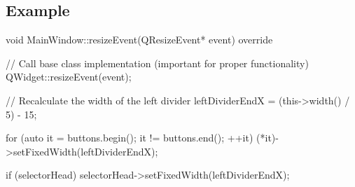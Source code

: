 \documentclass{report}
\begin{document}
    \subsection{Example}
    \bigbreak \noindent 
    \begin{cppcode}
void MainWindow::resizeEvent(QResizeEvent* event) override {
    // Call base class implementation (important for proper functionality)
    QWidget::resizeEvent(event);

    // Recalculate the width of the left divider
    leftDividerEndX = (this->width() / 5) - 15;

    for (auto it = buttons.begin(); it != buttons.end(); ++it) {
        (*it)->setFixedWidth(leftDividerEndX);
    }

    if (selectorHead) {
        selectorHead->setFixedWidth(leftDividerEndX);
    }
}

    \end{cppcode}
    





    







    
    
\end{document}
